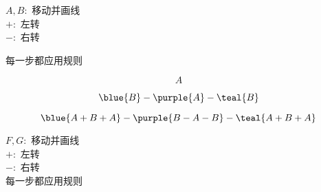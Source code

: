 \begin{frame}{}

  \vspace{0.20cm}
  \begin{center}
    $A, B:$ 移动并画线 \\[12pt]
    $+:$ 左转 \\[12pt]
    $-:$ 右转

    \vspace{0.60cm}
    每一步都应用规则
  \end{center}
\end{frame}

\begin{frame}{}
  \begin{center}
    \[
      A
    \]

    \[
      \blue{B} - \purple{A} - \teal{B}
    \]

    \pause
    \[
      \blue{A + B + A} - \purple{B - A - B} - \teal{A + B + A}
    \]

    \pause
  \end{center}
\end{frame}

\begin{frame}{}
  \begin{center}
  \end{center}
\end{frame}

\begin{frame}{}

  \vspace{0.20cm}
  \begin{center}
    $F, G:$ 移动并画线 \\[12pt]
    $+:$ 左转 \\[12pt]
    $-:$ 右转 \\[12pt]

    \vspace{0.20cm}
    每一步都应用规则
  \end{center}
\end{frame}

